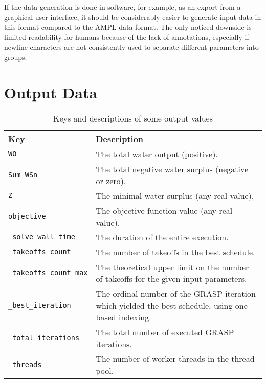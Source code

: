 If the data generation is done in software, for example, as an export from a graphical user interface, it should be considerably easier to generate input data in this format compared to the AMPL data format.
The only noticed downside is limited readability for humans because of the lack of annotations, especially if newline characters are not consistently used to separate different parameters into groups.


\section{Output Data}

\begin{table}[htbp]
\caption{Keys and descriptions of some output values}
\label{tbl:output-params}
\small
\centering

\newcommand{\twoline}[2]{\begin{tabular}[t]{@{}l@{}}\texttt{#1} \\ \texttt{#2}\end{tabular}}
\newcommand{\threeline}[3]{\begin{tabular}[t]{@{}l@{}}\texttt{#1} \\ \texttt{#2} \\ \texttt{#3}\end{tabular}}
\newcommand{\thinline}{\specialrule{.001em}{.2em}{.2em}}

\begin{tabularx}{\hsize}{@{}lX@{}}
Key & Description \\
\midrule
\texttt{WO}        & The total water output (positive). \\
\texttt{Sum\_WSn}  & The total negative water surplus (negative or zero). \\
\texttt{Z}         & The minimal water surplus (any real value). \\
\texttt{objective} & The objective function value (any real value). \\

\thinline

\texttt{\_solve\_wall\_time}    & The duration of the entire execution. \\
\texttt{\_takeoffs\_count}      & The number of takeoffs in the best schedule. \\
\texttt{\_takeoffs\_count\_max} & The theoretical upper limit on the number of takeoffs for the given input parameters. \\
\texttt{\_best\_iteration}      & The ordinal number of the GRASP iteration which yielded the best schedule, using one-based indexing. \\
\texttt{\_total\_iterations}    & The total number of executed GRASP iterations. \\
\texttt{\_threads}              & The number of worker threads in the thread pool. \\


\end{tabularx}
\end{table}
